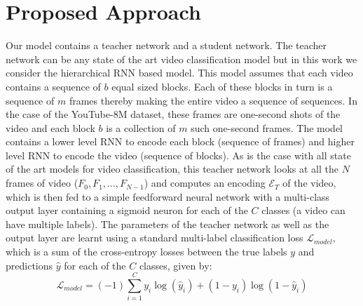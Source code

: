 \documentclass[10pt,twocolumn,letterpaper]{article}
\begin{document}
\section{Proposed Approach}\label{section3}
Our model contains a teacher network and a student network. The teacher network can be any state of the art video classification model but in this work we consider the hierarchical RNN based model. This model assumes that each video contains a sequence of $b$ equal sized blocks. Each of these blocks in turn is a sequence of $m$ frames thereby making the entire video a sequence of sequences. In the case of the YouTube-8M dataset, these frames are one-second shots of the video and each block $b$ is a collection of $m$ such one-second frames. The model contains a lower level RNN to encode each block (sequence of frames) and higher level RNN to encode the video (sequence of blocks). As is the case with all state of the art models for video classification, this teacher network looks at all the $N$ frames of video ($F_{0}, F_{1},\dots,F_{N-1}$) and computes an encoding $\mathcal{E}_{T}$ of the video, which is then fed to a simple feedforward neural network with a multi-class output layer containing a sigmoid neuron for each of the $C$ classes (a video can have multiple labels). The parameters of the teacher network as well as the output layer are learnt using  a standard multi-label classification loss $\mathcal{L}_{model}$, which is a sum of the cross-entropy losses between the true labels $y$ and predictions $\hat{y}$ for each of the $C$ classes, given by:\[ \mathcal{L}_{model} = (- 1) \sum_{i=1}^{C} y_{i} \log(\hat{y}_{i}) + (1- y_{i}) \log(1- \hat{y}_{i}) \]
\end{document}
